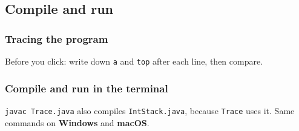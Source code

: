 \documentclass[aspectratio=169,10pt,compress]{beamer}
\newcommand{\win}{\textbf{Windows}}
\newcommand{\mac}{\textbf{macOS}}
\begin{document}
\subsection[Compile]{Compile and run}




\begin{frame}[t,fragile] \frametitle{Tracing the program}
  \small Before you click: write down \texttt{a} and \texttt{top} after each line, then compare.
\end{frame}




\begin{frame}[t,fragile] \frametitle{Compile and run in the terminal}

  \vspace{0.1em}
  \small
  \texttt{javac Trace.java} also compiles \texttt{IntStack.java}, because \texttt{Trace} uses it. Same commands on \win{} and \mac.
\end{frame}
\end{document}
